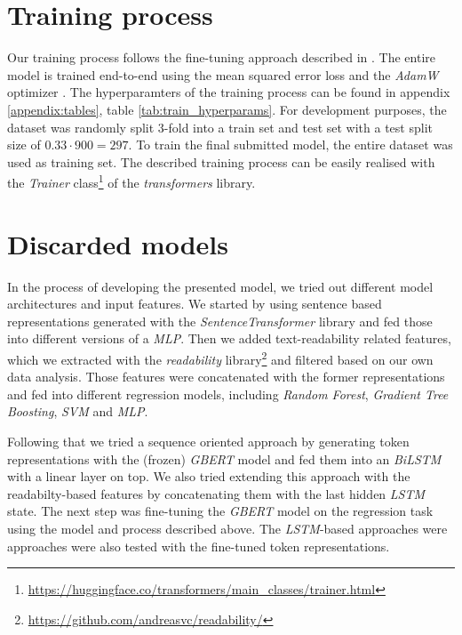\documentclass[11pt, DIV12]{scrartcl}
\begin{document}
\section{Training process}
\label{sec:train}

Our training process follows the fine-tuning approach described in \cite{DBLP:journals/corr/abs-1810-04805}. The entire model is trained end-to-end using the mean squared error loss and the \textit{AdamW} optimizer \cite{DBLP:journals/corr/abs-1711-05101}. The hyperparamters of the training process can be found in appendix \ref{appendix:tables}, table \ref{tab:train_hyperparams}. For development purposes, the dataset was randomly split 3-fold into a train set and test set with a test split size of \(0.33 \cdot 900 = 297\). To train the final submitted model, the entire dataset was used as training set. The described training process can be easily realised with the \textit{Trainer} class\footnote{\url{https://huggingface.co/transformers/main_classes/trainer.html}} of the \textit{transformers} library.


\section{Discarded models}
In the process of developing the presented model, we tried out different model architectures and input features. We started by using sentence based representations generated with the \textit{SentenceTransformer} \cite{reimers-2019-sentence-bert} library and fed those into different versions of a \textit{MLP}. Then we added text-readability related features, which we extracted with the \textit{readability} library\footnote{\url{https://github.com/andreasvc/readability/}} and filtered based on our own data analysis. Those features were concatenated with the former representations and fed into different regression models, including \textit{Random Forest}, \textit{Gradient Tree Boosting}, \textit{SVM} and \textit{MLP}.

Following that we tried a sequence oriented approach by generating token representations with the (frozen) \textit{GBERT} model and fed them into an \textit{BiLSTM} with a linear layer on top. We also tried extending this approach with the readabilty-based features by concatenating them with the last hidden \textit{LSTM} state. The next step was fine-tuning the \textit{GBERT} model on the regression task using the model and process described above. The \textit{LSTM}-based approaches were approaches were also tested with the fine-tuned token representations. 
\end{document}
